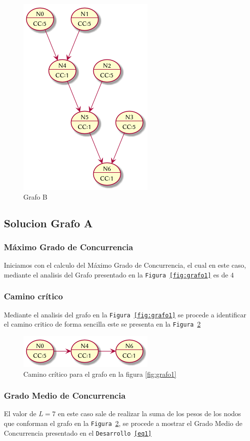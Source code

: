 \documentclass{article}
\begin{document}
\begin{figure}[H]
  \centering
  \includegraphics[width=.4\linewidth]{grafo2}
  \caption{Grafo B}
  \label{fig:grafo2}
\end{figure}

\subsection{Solucion Grafo A}
\label{pnt:sgra}
\subsubsection{M\'aximo Grado de Concurrencia}
Iniciamos con el calculo del M\'aximo Grado de Concurrencia, el cual en este
caso, mediante el analisis del Grafo presentado en la \texttt{Figura
\ref{fig:grafo1}} es de $4$

\subsubsection{Camino cr\'itico}
Mediante el analisis del grafo en la \texttt{Figura
\ref{fig:grafo1}} se procede a identificar el camino critico de forma sencilla
este se presenta en la \texttt{Figura \ref{fig:cc1}}
\begin{figure}[H]
  \centering
  \includegraphics[width=.4\linewidth]{grafo1_cc}
  \caption{Camino cr\'itico para el grafo en la figura \ref{fig:grafo1}}
  \label{fig:cc1}
\end{figure}

\subsubsection{Grado Medio de Concurrencia}
El valor de $L=7$ en este caso sale de realizar la suma de los pesos de los
nodos que conforman el grafo en la \texttt{Figura \ref{fig:cc1}}, se procede a mostrar
el Grado Medio de Concurrencia presentado en el \texttt{Desarrollo \ref{eq1}}
\end{document}
